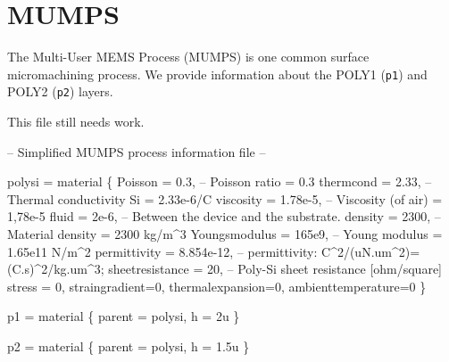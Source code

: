 
\section{MUMPS}

The Multi-User MEMS Process (MUMPS) is one common surface
micromachining process.  We provide information about
the POLY1 ({\tt{}p1}) and POLY2 ({\tt{}p2}) layers.

This file still needs work.

\endmoddef
-- Simplified MUMPS process information file --

polysi =
material \{
  Poisson = 0.3,            -- Poisson ratio = 0.3
  thermcond = 2.33,         -- Thermal conductivity Si = 2.33e-6/C
  viscosity = 1.78e-5,      -- Viscosity (of air) = 1,78e-5
  fluid = 2e-6,             -- Between the device and the substrate.
  density = 2300,           -- Material density = 2300 kg/m^3
  Youngsmodulus = 165e9,    -- Young modulus = 1.65e11 N/m^2
  permittivity = 8.854e-12, -- permittivity: C^2/(uN.um^2)=(C.s)^2/kg.um^3;
  sheetresistance = 20,     -- Poly-Si sheet resistance [ohm/square]
  stress = 0,
  straingradient=0,
  thermalexpansion=0,
  ambienttemperature=0
\}

p1 = 
material \{
  parent = polysi,
  h = 2u
\}

p2 =
material \{
  parent = polysi,
  h = 1.5u
\}

\nwendcode{}

%
\nwdocspar

\nwenddocs{}

